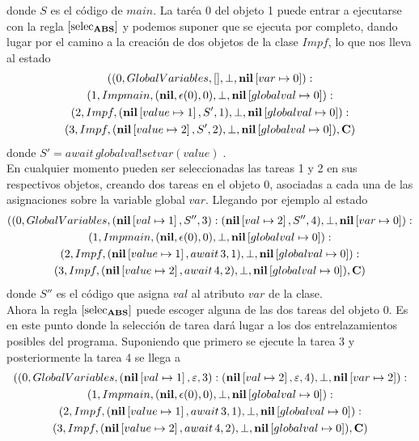donde $S$ es el código de $main$. La taréa 0 del objeto 1 puede entrar a ejecutarse con la regla $\left[ \text{selec}_{\text{\textbf{ABS}}} \right]$ y podemos suponer que se ejecuta por completo, dando lugar por el camino a la creación de dos objetos de la clase $Impf$, lo que nos lleva al estado
\begin{multline*}
  ((0, GlobalVariables, [], \perp, \textbf{nil}\left[ var\mapsto0 \right]):\\
  (1, Impmain, (\textbf{nil}, \epsilon(0), 0), \perp, \textbf{nil}\left[ globalval\mapsto0 \right]):\\
  (2, Impf, (\textbf{nil}\left[ value\mapsto1 \right], S', 1), \perp, \textbf{nil}\left[ globalval\mapsto0 \right]):\\
  (3, Impf ,(\textbf{nil}\left[ value\mapsto2 \right], S', 2), \perp, \textbf{nil}\left[ globalval\mapsto0 \right]), \mathbf{C})
\end{multline*}
donde $S' = await\, globalval!setvar(value)\;$.\\

En cualquier momento pueden ser seleccionadas las tareas 1 y 2 en sus respectivos objetos, creando dos tareas en el objeto 0, asociadas a cada una de las asignaciones sobre la variable global $var$. Llegando por ejemplo al estado
\begin{multline*}
  ((0, GlobalVariables, (\textbf{nil}\left[ val\mapsto1 \right], S'', 3):(\textbf{nil}\left[ val\mapsto2 \right], S'',4), \perp, \textbf{nil}\left[ var\mapsto0 \right]):\\
  (1, Impmain, (\textbf{nil}, \epsilon(0), 0), \perp, \textbf{nil}\left[ globalval\mapsto0 \right]):\\
  (2, Impf, (\textbf{nil}\left[ value\mapsto1 \right], await\,3, 1), \perp, \textbf{nil}\left[ globalval\mapsto0 \right]):\\
  (3, Impf ,(\textbf{nil}\left[ value\mapsto2 \right], await\,4, 2), \perp, \textbf{nil}\left[ globalval\mapsto0 \right]), \mathbf{C})
\end{multline*}
donde $S''$ es el código que asigna $val$ al atributo $var$ de la clase.\\

Ahora la regla $\left[ \text{selec}_{\text{\textbf{ABS}}} \right]$ puede escoger alguna de las dos tareas del objeto 0. Es en este punto donde la selección de tarea dará lugar a los dos entrelazamientos posibles del programa. Suponiendo que primero se ejecute la tarea 3 y posteriormente la tarea 4 se llega a
\begin{multline*}
  ((0, GlobalVariables, (\textbf{nil}\left[ val\mapsto1 \right], \varepsilon, 3):(\textbf{nil}\left[ val\mapsto2 \right], \varepsilon, 4), \perp, \textbf{nil}\left[ var\mapsto2 \right]):\\
  (1, Impmain, (\textbf{nil}, \epsilon(0), 0), \perp, \textbf{nil}\left[ globalval\mapsto0 \right]):\\
  (2, Impf, (\textbf{nil}\left[ value\mapsto1 \right], await\,3, 1), \perp, \textbf{nil}\left[ globalval\mapsto0 \right]):\\
  (3, Impf ,(\textbf{nil}\left[ value\mapsto2 \right], await\,4, 2), \perp, \textbf{nil}\left[ globalval\mapsto0 \right]), \mathbf{C})
\end{multline*}

